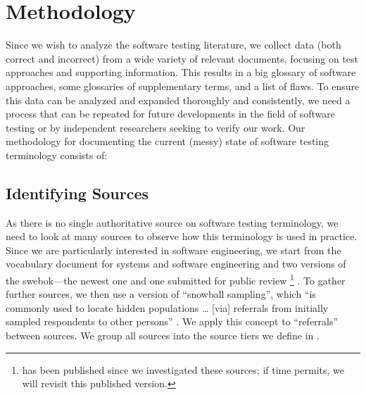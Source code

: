 \section{Methodology}\label{methodology}

Since we wish to analyze the software testing literature, we collect data (both
correct and incorrect) from a wide variety of relevant documents, focusing on
test approaches and supporting information. This results in a big
glossary of software approaches, some glossaries of supplementary terms, and a
list of flaws. To ensure this data can be analyzed and expanded thoroughly and
consistently, we need a process that can be repeated for future developments in
the field of software testing or by independent researchers seeking to verify
our work. Our methodology for documenting the current (messy) state of software
testing terminology consists of:



\subsection{Identifying Sources}\label{ident-sources}
As there is no single authoritative source on software testing terminology,
we need to look at many sources to observe how this terminology is used in
practice. Since we are particularly interested in software engineering, we
start from the vocabulary document for systems and software engineering%
\citep{IEEE2017} and two versions of the \acf{swebok}---the newest
one \citep{SWEBOK2014} and one submitted for public review%
\footnote{%
     \citet{SWEBOK2024} has been published since we investigated
    these sources; if time permits, we will revisit this published version.
}
\citep{SWEBOK2024}. To gather further sources, we then use a version of
``snowball sampling'',
which ``is commonly used to locate hidden populations \dots{} [via] referrals
from initially sampled respondents to other persons'' \citep{Johnson2014}. We
apply this concept to ``referrals'' between sources. \addTextEx{} We group all
sources into the source tiers we define in \listAllSrcs{}.

